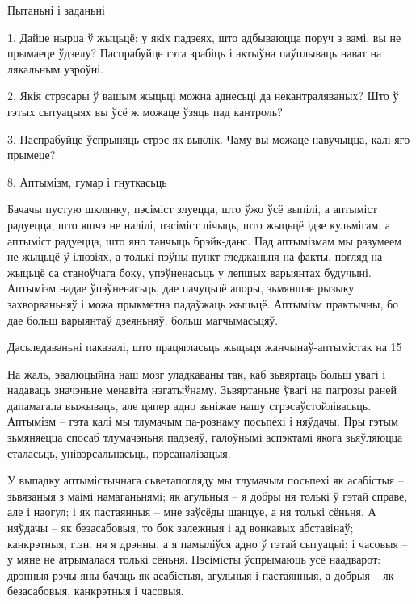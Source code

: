 Пытаньні і заданьні

1. Дайце нырца ў жыцьцё: у якіх падзеях, што адбываюцца поруч з вамі, вы не прымаеце ўдзелу? Паспрабуйце гэта зрабіць і актыўна паўплываць нават на лякальным узроўні.

2. Якія стрэсары ў вашым жыцьці можна аднесьці да некантраляваных? Што ў гэтых сытуацыях вы ўсё ж можаце ўзяць пад кантроль?

3. Паспрабуйце ўспрыняць стрэс як выклік. Чаму вы можаце навучыцца, калі яго прымеце?


8. Аптымізм, гумар і гнуткасьць

Бачачы пустую шклянку, пэсіміст злуецца, што ўжо ўсё выпілі, а аптыміст радуецца, што яшчэ не налілі, пэсіміст лічыць, што жыцьцё ідзе кульмігам, а аптыміст радуецца, што яно танчыць брэйк-данс. Пад аптымізмам мы разумеем не жыцьцё ў ілюзіях, а толькі пэўны пункт гледжаньня на факты, погляд на жыцьцё са станоўчага боку, упэўненасьць у лепшых варыянтах будучыні. Аптымізм надае ўпэўненасьць, дае пачуцьцё апоры, зьмяншае рызыку захворваньняў і можа прыкметна падаўжаць жыцьцё. Аптымізм практычны, бо дае больш варыянтаў дзеяньняў, больш магчымасьцяў.

Дасьледаваньні паказалі, што працягласьць жыцьця жанчынаў-аптымістак на 15%

На жаль, эвалюцыйна наш мозг уладкаваны так, каб зьвяртаць больш увагі і надаваць значэньне менавіта нэгатыўнаму. Зьвяртаньне ўвагі на пагрозы раней дапамагала выжываць, але цяпер адно зьніжае нашу стрэсаўстойлівасьць. Аптымізм – гэта калі мы тлумачым па-рознаму посьпехі і няўдачы. Пры гэтым зьмяняецца спосаб тлумачэньня падзеяў, галоўнымі аспэктамі якога зьяўляюцца сталасьць, унівэрсальнасьць, пэрсаналізацыя. 

У выпадку аптымістычнага сьветапогляду мы тлумачым посьпехі як асабістыя – зьвязаныя з маімі намаганьнямі; як агульныя – я добры ня толькі ў гэтай справе, але і наогул; і як пастаянныя – мне заўсёды шанцуе, а ня толькі сёньня. А няўдачы – як безасабовыя, то бок залежныя і ад вонкавых абставінаў; канкрэтныя, г.зн. ня я дрэнны, а я памыліўся адно ў гэтай сытуацыі; і часовыя – у мяне не атрымалася толькі сёньня. Пэсімісты ўспрымаюць усё наадварот: дрэнныя рэчы яны бачаць як асабістыя, агульныя і пастаянныя, а добрыя – як безасабовыя, канкрэтныя і часовыя.

